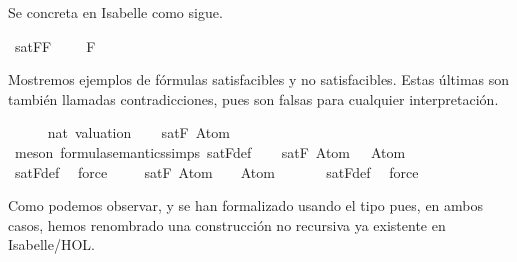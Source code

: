 \begin{isabellebody}
\begin{isamarkuptext}
  Se concreta en Isabelle como sigue.%
\end{isamarkuptext}\isamarkuptrue%
\isamarkupfalse%
\ {\isachardoublequoteopen}satF{\isacharparenleft}F{\isacharparenright}\ {\isasymequiv}\ {\isasymexists}{\isasymA}{\isachardot}\ {\isasymA}\ {\isasymTurnstile}\ F{\isachardoublequoteclose}%
\begin{isamarkuptext}%
Mostremos ejemplos de fórmulas satisfacibles y no satisfacibles.
  Estas últimas son también llamadas contradicciones, pues son
  falsas para cualquier interpretación.%
\end{isamarkuptext}\isamarkuptrue%
\isamarkupfalse%
\isanewline
{}\isanewline
%
\isadelimproof
\ \ %
\endisadelimproof
%
\isatagproof
{}\isamarkupfalse%
\ {\isasymA}\ {\isacharcolon}{\isacharcolon}\ {\isachardoublequoteopen}nat\ valuation{\isachardoublequoteclose}\isanewline
\isanewline
\ \ \isamarkupfalse%
\ {\isachardoublequoteopen}satF\ {\isacharparenleft}Atom\ {}{\isacharparenright}{\isachardoublequoteclose}\isanewline
\ \ \ \ \isamarkupfalse%
\ {\isacharparenleft}meson\ formula{\isacharunderscore}semantics{\isachardot}simps{\isacharparenleft}{}{\isacharparenright}\ satF{\isacharunderscore}def{\isacharparenright}\isanewline
\isanewline
\ \ \isamarkupfalse%
\ {\isachardoublequoteopen}satF\ {\isacharparenleft}Atom\ {}\ \isactrlbold {\isasymand}\ Atom\ {}{\isacharparenright}{\isachardoublequoteclose}\ \isanewline
\ \ \ \ \isamarkupfalse%
\ satF{\isacharunderscore}def\ \isamarkupfalse%
\ force\isanewline
\isanewline
\ \ \isamarkupfalse%
\ {\isachardoublequoteopen}{\isasymnot}\ satF\ {\isacharparenleft}Atom\ {}\ \isactrlbold {\isasymand}\ {\isacharparenleft}\isactrlbold {\isasymnot}\ {\isacharparenleft}Atom\ {}{\isacharparenright}{\isacharparenright}{\isacharparenright}{\isachardoublequoteclose}\isanewline
\ \ \ \ \isamarkupfalse%
\ satF{\isacharunderscore}def\ \isamarkupfalse%
\ force%
\endisatagproof
{\isafoldproof}%
%
\isadelimproof
\isanewline
%
\endisadelimproof
\isanewline
{}\isamarkupfalse%
%
\begin{isamarkuptext}%
Como podemos observar,  y  se han 
  formalizado usando el tipo  pues, en ambos casos, hemos
  renombrado una construcción no recursiva ya existente en Isabelle/HOL.


\end{isamarkuptext}
\end{isabellebody}

